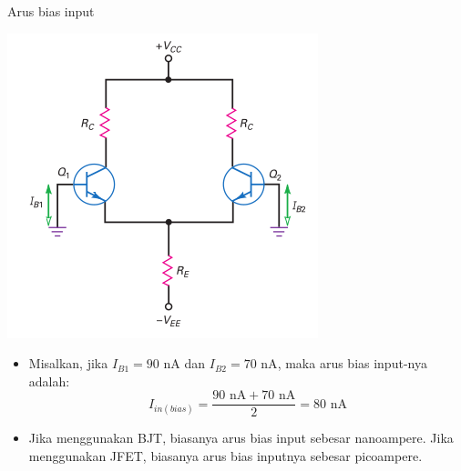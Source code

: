 \documentclass[aspectratio=169]{beamer}
\begin{document}
\begin{frame}{Arus bias input}
	\begin{multicols}{2}
		\begin{center}
			\includegraphics[height=0.7\textheight]{gambar/01.different_base_currents}
		\end{center}
		\columnbreak
		\begin{itemize}
			\item Misalkan, jika $ I_{B1} = 90 \text{ nA} $ dan $ I_{B2} = 70 \text{ nA} $, maka arus bias input-nya adalah:
			\[ I_{in(bias)} = \frac{ 90 \text{ nA} + 70 \text{ nA} }{2} = 80 \text{ nA}\]
			\item Jika menggunakan BJT, biasanya arus bias input sebesar nanoampere. Jika menggunakan JFET, biasanya arus bias inputnya sebesar picoampere.
		\end{itemize}
	\end{multicols}
\end{frame}
\end{document}
